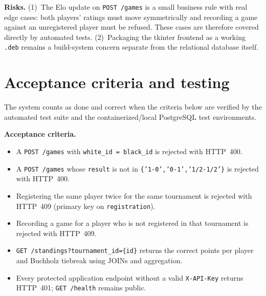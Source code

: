 \documentclass[11pt,a4paper]{article}
\begin{document}
\textbf{Risks.} (1)~The Elo update on \texttt{POST /games} is a small business
rule with real edge cases: both players' ratings must move symmetrically and
recording a game against an unregistered player must be refused. These cases
are therefore covered directly by automated tests.
(2)~Packaging the tkinter frontend as a working \texttt{.deb} remains a
build-system concern separate from the relational database itself.

\section{Acceptance criteria and testing}

The system counts as done and correct when the criteria below are verified by
the automated test suite and the containerized/local PostgreSQL test environments.

\textbf{Acceptance criteria.}
\begin{itemize}[topsep=2pt]
  \item A \texttt{POST /games} with \texttt{white\_id = black\_id} is rejected
        with HTTP~400.
  \item A \texttt{POST /games} whose \texttt{result} is not in
        \texttt{\{'1-0','0-1','1/2-1/2'\}} is rejected with HTTP~400.
  \item Registering the same player twice for the same tournament is rejected
        with HTTP~409 (primary key on \texttt{registration}).
  \item Recording a game for a player who is not registered in that
        tournament is rejected with HTTP~409.
  \item \texttt{GET /standings?tournament\_id=\{id\}} returns the correct
        points per player and Buchholz tiebreak using JOINs and aggregation.
  \item Every protected application endpoint without a valid
        \texttt{X-API-Key} returns HTTP~401; \texttt{GET /health} remains public.
\end{itemize}
\end{document}

